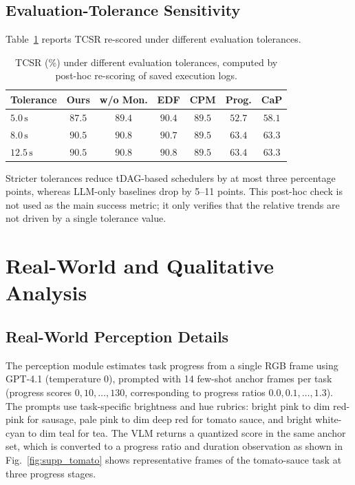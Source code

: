 \documentclass[letterpaper,10pt,onecolumn]{IEEEtran}
\begin{document}
\subsection{Evaluation-Tolerance Sensitivity}\label{supp:tolerance}
Table~\ref{tab:supp_tolerance} reports TCSR re-scored under different
evaluation tolerances.
\begin{table}[H]
\centering
\caption{TCSR (\%) under different evaluation tolerances, computed by
post-hoc re-scoring of saved execution logs.}
\label{tab:supp_tolerance}
{\small
\begin{tabular}{@{}lcccccc@{}}
\toprule
\textbf{Tolerance} & \textbf{Ours} & \textbf{w/o Mon.} & \textbf{EDF} & \textbf{CPM} & \textbf{Prog.} & \textbf{CaP} \\
\midrule
$5.0\,\mathrm{s}$  & $87.5$ & $89.4$ & $90.4$ & $89.5$ & $52.7$ & $58.1$ \\
$8.0\,\mathrm{s}$  & $90.5$ & $90.8$ & $90.7$ & $89.5$ & $63.4$ & $63.3$ \\
$12.5\,\mathrm{s}$ & $90.5$ & $90.8$ & $90.8$ & $89.5$ & $63.4$ & $63.3$ \\
\bottomrule
\end{tabular}
}
\end{table}
Stricter tolerances reduce tDAG-based schedulers by at most three percentage
points, whereas LLM-only baselines drop by 5--11 points. This post-hoc check
is not used as the main success metric; it only verifies that the relative
trends are not driven by a single tolerance value.

\section{Real-World and Qualitative Analysis}
\subsection{Real-World Perception Details}\label{supp:perception}
The perception module estimates task progress from a single RGB frame using
GPT-4.1 (temperature $0$), prompted with 14 few-shot anchor frames per task
(progress scores $0,10,\ldots,130$, corresponding to progress ratios
$0.0,0.1,\ldots,1.3$). The prompts use task-specific brightness and hue
rubrics: bright pink to dim red-pink for sausage, pale pink to dim deep red
for tomato sauce, and bright white-cyan to dim teal for tea. The VLM returns
a quantized score in the same anchor set, which is converted to a progress
ratio and duration observation as shown in
Fig.~\ref{fig:supp_tomato} shows representative
frames of the tomato-sauce task at three progress stages.
\end{document}
